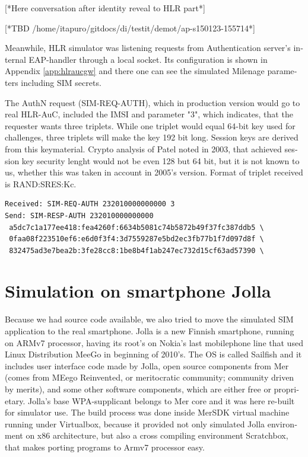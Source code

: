 \documentclass[12pt,a4paper,english]{tutthesis}
\begin{document}
\begin{otherlanguage}{english}
[*Here conversation after identity reveal to HLR part*]

[*TBD /home/itapuro/gitdocs/di/testit/demot/ap-s150123-155714*]

Meanwhile, HLR simulator was listening requests from Authentication
server's internal EAP-handler through a local socket. 
Its configuration is shown in
Appendix \ref{app:hlraucgw} and there one can see the simulated Milenage parameters including SIM secrets.



The AuthN request (SIM-REQ-AUTH), which in production version would go
to real HLR-AuC, included the IMSI and parameter "3", which indicates,
that the requester wants three triplets.  
While one triplet would equal 64-bit key used for challenges, three
triplets will make the key 192 bit long. Session keys are derived from
this keymaterial. Crypto analysis of Patel\cite{patel-sim} noted in
2003, that achieved session key security lenght would not be even 128
but 64 bit, but it is not known to us, whether this was taken in
account in 2005's version. 
Format of triplet received is RAND:SRES:Kc.

\footnotesize
\begin{verbatim}
Received: SIM-REQ-AUTH 232010000000000 3
Send: SIM-RESP-AUTH 232010000000000 
 a5dc7c1a177ee418:fea4260f:6634b5081c74b5872b49f37fc387ddb5 \
 0faa08f223510ef6:e6d0f3f4:3d7559287e5bd2ec3fb77b1f7d097d8f \
 832475ad3e7bea2b:3fe28cc8:1be8b4f1ab247ec732d15cf63ad57390 \
\end{verbatim}
\normalsize


\section{Simulation on smartphone Jolla}
\label{sec-5-3}

Because we had source code available, we also tried to move the
simulated SIM application to the real smartphone.  Jolla is a new
Finnish smartphone, running on ARMv7 processor, having its root's on
Nokia's last mobilephone line that used Linux Distribution MeeGo in
beginning of 2010's.  The OS is called Sailfish and it includes user
interface code made by Jolla, open source components from Mer (comes
from MEego
Reinvented, or meritocratic community; community driven by merits), and some other software
components, which are either free or proprietary.  Jolla's base
WPA-supplicant belongs to Mer core and it was here re-built for
simulator use. The build process was done inside MerSDK virtual
machine running under Virtualbox, because it provided not only
simulated Jolla environment on x86 architecture, but also a cross
compiling environment Scratchbox, that makes porting programs to Armv7
processor easy.


\end{otherlanguage}
\end{document}
